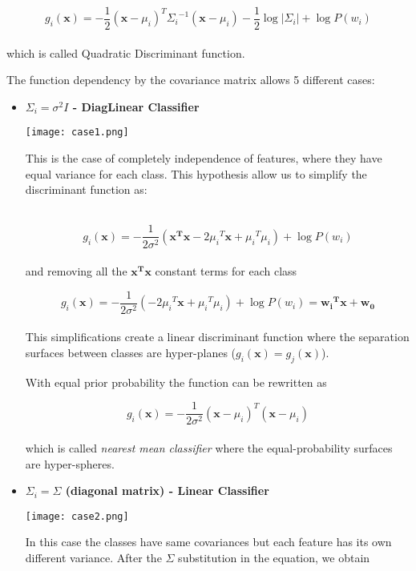 \documentclass{standalone}
\begin{document}
$$
g_i(\mathbf{x}) = -\frac{1}{2}(\mathbf{x}-\mu_i)^T{\Sigma_i}^{-1}(\mathbf{x}-\mu_i) -\frac{1}{2}\log\left|\Sigma_i\right|+\log P(w_i)
$$
\\
which is called Quadratic Discriminant function.

The function dependency by the covariance matrix allows 5 different cases:

\begin{itemize}

\item \textbf{$\Sigma_i=\sigma^2I$ - DiagLinear Classifier}

\begin{minipage}{.30\textwidth}
\hspace{-.5cm}
\texttt{[image: case1.png]}
\end{minipage}%
\begin{minipage}{.70\textwidth}
This is the case of completely independence of features, where they have equal variance for each class.
This hypothesis allow us to simplify the discriminant function as:
\end{minipage}\\

$$
g_i(\mathbf{x})=-\frac{1}{2\sigma^2}(\mathbf{x^Tx}-2{\mu_i}^T\mathbf{x} + {\mu_i}^T\mu_i) + \log P(w_i)
$$
\\
and removing all the $\mathbf{x^Tx}$ constant terms for each class

$$
g_i(\mathbf{x}) = -\frac{1}{2\sigma^2}(-2{\mu_i}^T\mathbf{x}+{\mu_i}^T\mu_i)+\log P(w_i) = \mathbf{{w_i}^Tx}+\mathbf{w_0}
$$
\\
This simplifications create a linear discriminant function where the separation surfaces between classes are hyper-planes ($g_i(\mathbf{x})=g_j(\mathbf{x})$).

With equal prior probability the function can be rewritten as

$$
g_i(\mathbf{x}) = -\frac{1}{2\sigma^2}(\mathbf{x}-\mu_i)^T(\mathbf{x}-\mu_i)
$$
\\
which is called \emph{nearest mean classifier} where the equal-probability surfaces are hyper-spheres.


\item \textbf{$\Sigma_i = \Sigma$ (diagonal matrix) - Linear Classifier}

\begin{minipage}{.30\textwidth}
\hspace{-.5cm}
\texttt{[image: case2.png]}
\end{minipage}%
\begin{minipage}{.70\textwidth}
In this case the classes have same covariances but each feature has its own different variance.
After the $\Sigma$ substitution in the equation, we obtain
\end{minipage}\\


\end{itemize}
\end{document}
